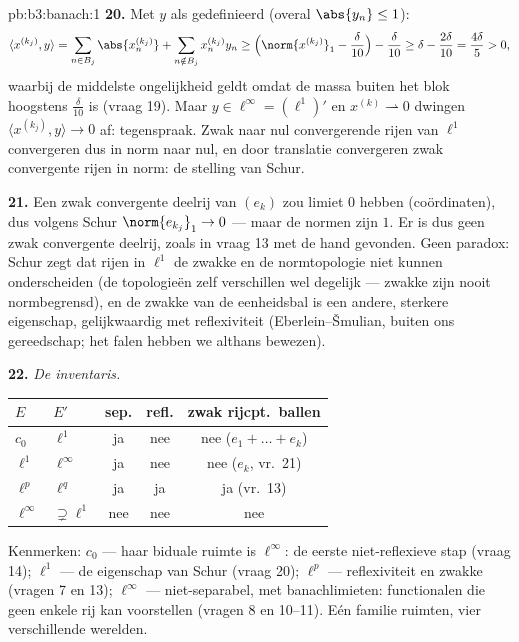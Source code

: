 \begin{solution}{pb:b3:banach:1}
\textbf{20.} Met $y$ als gedefinieerd (overal $\abs{y_n} \leq 1$):
\[
\langle x^{(k_j)}, y\rangle
= \sum_{n \in B_j}\abs{x^{(k_j)}_n}
+ \sum_{n \notin B_j}x^{(k_j)}_ny_n
\geq \Bigl(\norm{x^{(k_j)}}_1 - \frac\delta{10}\Bigr) -
\frac\delta{10}
\geq \delta - \frac{2\delta}{10} = \frac{4\delta}5 > 0,
\]
waarbij de middelste ongelijkheid geldt omdat de massa buiten het
blok hoogstens $\frac\delta{10}$ is (vraag 19). Maar $y \in
\ell^\infty = (\ell^1)'$ en $x^{(k)} \rightharpoonup 0$ dwingen
$\langle x^{(k_j)}, y\rangle \to 0$ af: tegenspraak. Zwak naar nul
convergerende rijen van $\ell^1$ convergeren dus in norm naar nul,
en door translatie convergeren zwak convergente rijen in norm: de
stelling van Schur.

\textbf{21.} Een zwak convergente deelrij van $(e_k)$ zou limiet
$0$ hebben (coördinaten), dus volgens Schur $\norm{e_{k_j}}_1 \to
0$ --- maar de normen zijn $1$. Er is dus geen zwak convergente
deelrij, zoals in vraag 13 met de hand gevonden. Geen paradox:
Schur zegt dat rijen in $\ell^1$ de zwakke en de normtopologie
niet kunnen onderscheiden (de topologieën zelf verschillen wel
degelijk --- zwakke  zijn nooit normbegrensd), en de
zwakke  van de eenheidsbal is een andere, sterkere
eigenschap, gelijkwaardig met reflexiviteit
(Eberlein--Šmulian, buiten ons gereedschap; het falen hebben we
althans bewezen).

\textbf{22.} \emph{De inventaris.}
\begin{center}
\begin{tabular}{l|l|c|c|c}
$E$ & $E'$ & sep. & refl. & zwak rijcpt.\ ballen\\
\hline
$c_0$ & $\ell^1$ & ja & nee & nee ($e_1{+}\dots{+}e_k$)\\
$\ell^1$ & $\ell^\infty$ & ja & nee & nee ($e_k$, vr.~21)\\
$\ell^p$ & $\ell^q$ & ja & ja & ja (vr.~13)\\
$\ell^\infty$ & $\supsetneq\ell^1$ & nee & nee & nee\\
\end{tabular}
\end{center}
Kenmerken: $c_0$ --- haar biduale ruimte is $\ell^\infty$: de
eerste niet-reflexieve stap (vraag 14); $\ell^1$ --- de
eigenschap van Schur (vraag 20); $\ell^p$ --- reflexiviteit en
zwakke  (vragen 7 en 13); $\ell^\infty$ ---
niet-separabel, met banachlimieten: functionalen die geen enkele
rij kan voorstellen (vragen 8 en 10--11). Eén familie ruimten,
vier verschillende werelden.


\end{solution}
